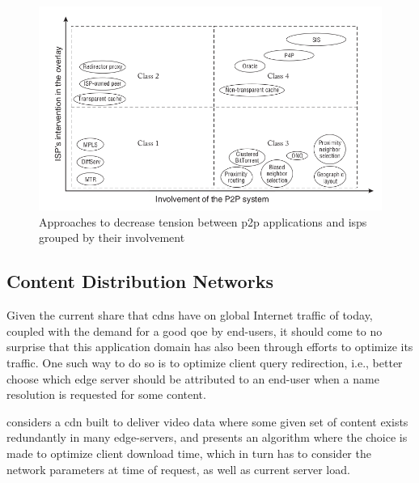     \begin{figure}[H]
    \centering
    \includegraphics[scale=0.65]{img/approaches-isp-p2p.png}
    \caption{Approaches to decrease tension between \gls{p2p} applications and \glspl{isp} grouped by their involvement \cite{dan-Commag10}}
    \label{fig:p2p-isp-interactions}
    \end{figure}

\subsection{Content Distribution Networks}

\label{ssec:cdns}

    Given the current share that \glspl{cdn} have on global Internet traffic of today, coupled with the demand for a good \gls{qoe} by end-users, it should come to no surprise that this application domain has also been through efforts to optimize its traffic.
    One such way to do so is to optimize client query redirection, i.e., better choose which edge server should be attributed to an end-user when a name resolution is requested for some content.

    \cite{gromov2014} considers a \gls{cdn} built to deliver video data where some given set of content exists redundantly in many edge-servers, and presents an algorithm where the choice is made to optimize client download time, which in turn has to consider the network parameters at time of request, as well as current server load.

